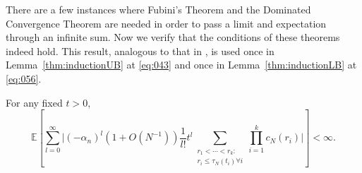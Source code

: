 \documentclass{article}
\newcommand{\E}{\mathbb{E}}
\newcommand{\1}[1]{\mathbbm{1}_{#1}}
\begin{document}
There are a few instances where Fubini's Theorem and the Dominated Convergence Theorem are needed in order to pass a limit and expectation through an infinite sum.
Now we verify that the conditions of these theorems indeed hold.
This result, analogous to that in \citet[Appendix]{koskela2018}, is used once
in Lemma~\ref{thm:inductionUB} at \eqref{eq:043} and once in Lemma~\ref{thm:inductionLB} at \eqref{eq:056}.
\begin{lemma}\label{thm:DCT_Fubini}
For any fixed $t>0$,
\begin{equation}
\E \left[ \sum_{l=0}^\infty \Bigg| (-\alpha_n)^l (1+O(N^{-1})) \frac{1}{l!} t^l 
        \sum_{\substack{r_1 < \cdots < r_k : \\ r_i \leq \tau_N(t_i) \forall i}}
        \prod_{i=1}^k c_N(r_i) \Bigg| \right]
< \infty .
\end{equation}

\end{lemma}
\end{document}
